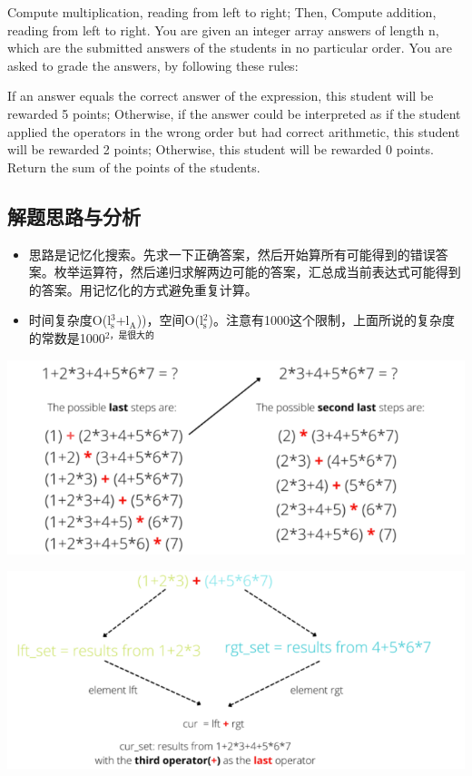 \documentclass[9pt, b5paaper]{book}
\begin{document}
Compute multiplication, reading from left to right; Then,
Compute addition, reading from left to right.
You are given an integer array answers of length n, which are the submitted answers of the students in no particular order. You are asked to grade the answers, by following these rules:

If an answer equals the correct answer of the expression, this student will be rewarded 5 points;
Otherwise, if the answer could be interpreted as if the student applied the operators in the wrong order but had correct arithmetic, this student will be rewarded 2 points;
Otherwise, this student will be rewarded 0 points.
Return the sum of the points of the students.
\subsection{解题思路与分析}
\label{sec-2-5-1}
\begin{itemize}
\item 思路是记忆化搜索。先求一下正确答案，然后开始算所有可能得到的错误答案。枚举运算符，然后递归求解两边可能的答案，汇总成当前表达式可能得到的答案。用记忆化的方式避免重复计算。
\item 时间复杂度O(l$_{\text{s}}^{\text{3}}$+l$_{\text{A}}$))，空间O(l$_{\text{s}}^{\text{2}}$)。注意有1000这个限制，上面所说的复杂度的常数是1000$^{\text{2，是很大的}}$
\end{itemize}

\includegraphics[width=.9\linewidth]{./pic/score.png}

\includegraphics[width=.9\linewidth]{./pic/score2.png}
\end{document}
